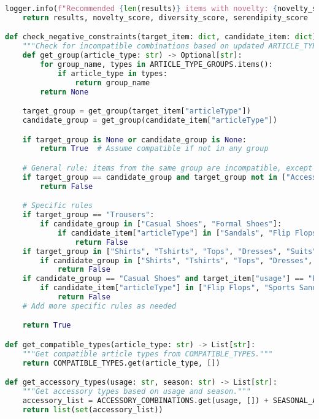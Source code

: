 \documentclass[12pt,a4paper]{article}
\begin{document}
\begin{lstlisting}[language=Python]
    logger.info(f"Recommended {len(results)} items with novelty: {novelty_score}, diversity: {diversity_score}, serendipity: {serendipity_score}")
    return results, novelty_score, diversity_score, serendipity_score

def check_negative_constraints(target_item: dict, candidate_item: dict) -> bool:
    """Check for incompatible combinations based on updated ARTICLE_TYPE_GROUPS."""
    def get_group(article_type: str) -> Optional[str]:
        for group_name, types in ARTICLE_TYPE_GROUPS.items():
            if article_type in types:
                return group_name
        return None

    target_group = get_group(target_item["articleType"])
    candidate_group = get_group(candidate_item["articleType"])

    if target_group is None or candidate_group is None:
        return True  # Assume compatible if not in any group

    # General rule: items from the same group are incompatible, except for accessories
    if target_group == candidate_group and target_group not in ["Accessories", "Jewellery", "Bags", "Makeup", "Skincare", "Bath and Body", "Haircare", "Fragrance", "Tech Accessories", "Home Decor"]:
        return False

    # Specific rules
    if target_group == "Trousers":
        if candidate_group in ["Casual Shoes", "Formal Shoes"]:
            if candidate_item["articleType"] in ["Sandals", "Flip Flops"] and target_item["usage"] != "Casual":
                return False
    if target_group in ["Shirts", "Tshirts", "Tops", "Dresses", "Suits"]:
        if candidate_group in ["Shirts", "Tshirts", "Tops", "Dresses", "Suits"]:
            return False
    if candidate_group == "Casual Shoes" and target_item["usage"] == "Formal":
        if candidate_item["articleType"] in ["Flip Flops", "Sports Sandals"]:
            return False
    # Add more specific rules as needed

    return True

def get_compatible_types(article_type: str) -> List[str]:
    """Get compatible article types from COMPATIBLE_TYPES."""
    return COMPATIBLE_TYPES.get(article_type, [])

def get_accessory_types(usage: str, season: str) -> List[str]:
    """Get accessory types based on usage and season."""
    accessory_list = ACCESSORY_COMBINATIONS.get(usage, []) + SEASONAL_ACCESSORIES.get(season, [])
    return list(set(accessory_list))



\end{lstlisting}
\end{document}
